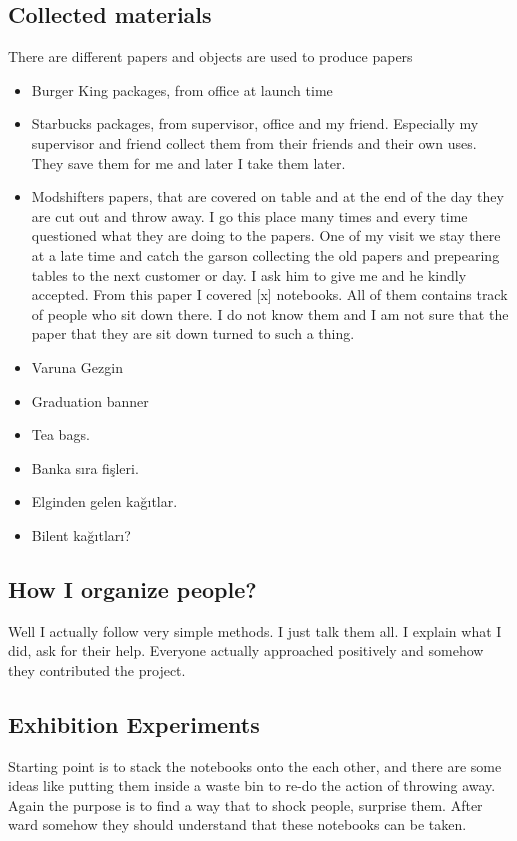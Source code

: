 \subsection{Collected materials}
There are different papers and objects are used to produce papers
\begin{itemize}
\item Burger King packages, from office at launch time
\item Starbucks packages, from supervisor, office and my friend. Especially my supervisor and friend collect them from their friends and their own uses. They save them for me and later I take them later. 
\item Modshifters papers, that are covered on table and at the end of the day they are cut out and throw away. I go this place many times and every time questioned what they are doing to the papers. One of my visit we stay there at a late time and catch the garson collecting the old papers and prepearing tables to the next customer or day. I ask him to give me and he kindly accepted. From this paper I covered [x] notebooks. All of them contains track of people who sit down there. I do not know them and I am not sure that the paper that they are sit down turned to such a thing. 
\item Varuna Gezgin
\item Graduation banner
\item Tea bags.
\item Banka sıra fişleri.
\item Elginden gelen kağıtlar.
\item Bilent kağıtları?
\end{itemize}

\subsection{How I organize people?}
Well I  actually follow very simple methods. I just talk them all. I explain what I did, ask for their help. Everyone actually approached positively and somehow they contributed the project.

\subsection{Exhibition Experiments}
Starting point is to stack the notebooks onto the each other, and there are some ideas like putting them inside a waste bin to re-do the action of throwing away. Again the purpose is to find a way that to shock people, surprise them. After ward somehow they should understand that these notebooks can be taken. 

